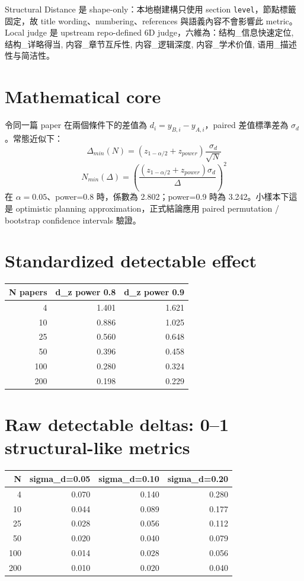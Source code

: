 \documentclass[11pt]{article}
\begin{document}
Structural Distance 是 shape-only：本地樹建構只使用 section \texttt{level}，節點標籤固定，故 title wording、numbering、references 與語義內容不會影響此 metric。Local judge 是 upstream repo-defined 6D judge，六維為：结构\_信息快速定位, 结构\_详略得当, 内容\_章节互斥性, 内容\_逻辑深度, 内容\_学术价值, 语用\_描述性与简洁性。

\section*{Mathematical core}
令同一篇 paper 在兩個條件下的差值為 $d_i=y_{B,i}-y_{A,i}$，paired 差值標準差為 $\sigma_d$。常態近似下：
\[
\Delta_{min}(N) = \left(z_{1-\alpha/2} + z_{power}\right) \frac{\sigma_d}{\sqrt{N}}
\]
\[
N_{min}(\Delta) = \left(\frac{\left(z_{1-\alpha/2} + z_{power}\right)\sigma_d}{\Delta}\right)^2
\]
在 $\alpha=0.05$、power=0.8 時，係數為 2.802；power=0.9 時為 3.242。小樣本下這是 optimistic planning approximation，正式結論應用 paired permutation / bootstrap confidence intervals 驗證。

\section*{Standardized detectable effect}
\begin{tabular}{rrr}
\toprule
N papers & d\_z power 0.8 & d\_z power 0.9 \\
\midrule
4 & 1.401 & 1.621 \\
10 & 0.886 & 1.025 \\
25 & 0.560 & 0.648 \\
50 & 0.396 & 0.458 \\
100 & 0.280 & 0.324 \\
200 & 0.198 & 0.229 \\
\bottomrule
\end{tabular}

\section*{Raw detectable deltas: 0--1 structural-like metrics}
\begin{tabular}{rrrr}
\toprule
N & sigma\_d=0.05 & sigma\_d=0.10 & sigma\_d=0.20 \\
\midrule
4 & 0.070 & 0.140 & 0.280 \\
10 & 0.044 & 0.089 & 0.177 \\
25 & 0.028 & 0.056 & 0.112 \\
50 & 0.020 & 0.040 & 0.079 \\
100 & 0.014 & 0.028 & 0.056 \\
200 & 0.010 & 0.020 & 0.040 \\
\bottomrule
\end{tabular}
\end{document}
